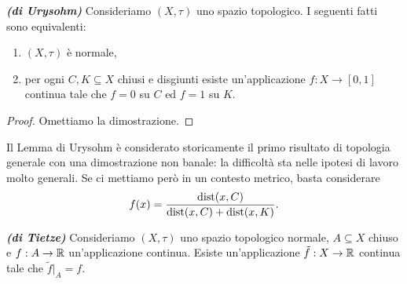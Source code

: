 \begin{lemma}\emph{\textbf{(di Urysohm)}} Consideriamo $(X,\tau)$ uno spazio topologico. I seguenti fatti sono equivalenti:
	\begin{enumerate}[$(a)$]
		\item $(X,\tau)$ è normale,
		\item per ogni $C,K \subseteq X$ chiusi e disgiunti esiste  un'applicazione $f: X \to [0,1]$ continua tale che $f= 0$ su $C$ ed $f=1$ su $K$.
	\end{enumerate}
\end{lemma}
\begin{proof}
	Omettiamo la dimostrazione.
\end{proof}
\begin{osservazione}
	Il Lemma di Urysohm è considerato storicamente il primo risultato di topologia generale con una dimostrazione non banale: la difficoltà sta nelle ipotesi di lavoro molto generali. Se ci mettiamo però in un contesto metrico, basta considerare
	\[ f(x) = \frac{\textup{dist}(x,C)}{\textup{dist}(x,C)+ \textup{dist}(x,K)}. \]
\end{osservazione}
\begin{teorema}\emph{\textbf{(di Tietze)}}
	Consideriamo $(X,\tau)$ uno spazio topologico normale, $A \subseteq X$ chiuso e $f: A \to \mathbb{R}$ un'applicazione continua. Esiste un'applicazione $\tilde{f}: X \to \mathbb{R}$ continua tale che $\tilde{f}|_A = f$.
\end{teorema}
